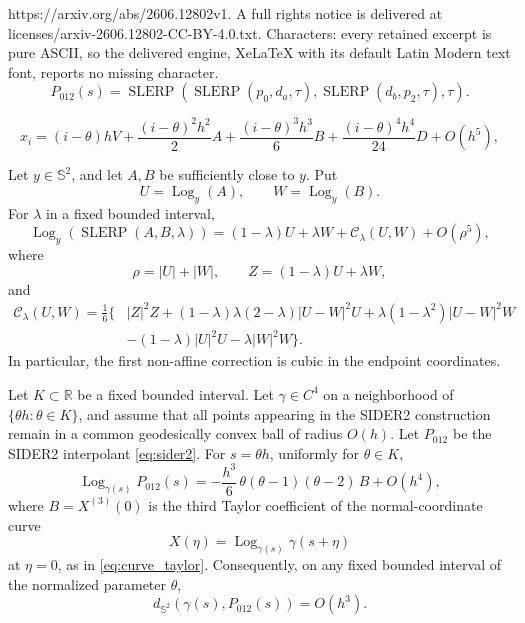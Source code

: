 \documentclass[10pt,a4paper]{amsart}
\newcommand{\Log}{\operatorname{Log}}
\newcommand{\SLERP}{\operatorname{SLERP}}
\newcommand{\bR}{\mathbb{R}}
\newcommand{\bS}{\mathbb{S}}
\begin{document}
https://arxiv.org/abs/2606.12802v1. A full rights notice is delivered at licenses/arxiv-2606.12802-CC-BY-4.0.txt. Characters: every retained excerpt is pure ASCII, so the delivered engine, XeLaTeX with its default Latin Modern text font, reports no missing character.
\begin{equation}
\label{eq:sider2}
P_{012}(s)
=
\SLERP\left(
        \SLERP(p_0,d_a,\tau),
        \SLERP(d_b,p_2,\tau),
        \tau
       \right).
\end{equation}

\begin{equation}
\label{eq:curve_taylor}
x_i
=
(i-\theta)h V
+\frac{(i-\theta)^2h^2}{2}A
+\frac{(i-\theta)^3h^3}{6}B
+\frac{(i-\theta)^4h^4}{24}D
+O(h^5),
\end{equation}

\begin{lemma}
\label{lem:cubic_slerp}
Let \(y\in\bS^2\), and let \(A,B\) be sufficiently close to \(y\).  Put
\[
        U=\Log_y(A),\qquad W=\Log_y(B).
\]
For \(\lambda\) in a fixed bounded interval,
\begin{equation}
\label{eq:cubic_slerp}
\Log_y\!\left(\SLERP(A,B,\lambda)\right)
=
(1-\lambda)U+\lambda W+\mathcal C_\lambda(U,W)+O(\rho^5),
\end{equation}
where
\[
        \rho=|U|+|W|,
        \qquad
        Z=(1-\lambda)U+\lambda W,
\]
and
\begin{align}
\label{eq:cubic_term}
\mathcal C_\lambda(U,W)
= \frac{1}{6}\Big\{&
|Z|^2Z
+(1-\lambda)\lambda(2-\lambda)|U-W|^2U
+\lambda(1-\lambda^2)|U-W|^2W     \nonumber\\
&-(1-\lambda)|U|^2U
-\lambda |W|^2W
\Big\}.
\end{align}
In particular, the first non-affine correction is cubic in the endpoint
coordinates.
\end{lemma}

\begin{prop}
\label{prop:sider2_refined}
Let \(K\subset\bR\) be a fixed bounded interval.  Let \(\gamma\in C^4\) on a
neighborhood of \(\{\theta h:\theta\in K\}\), and assume that all points
appearing in the SIDER2 construction remain in a common geodesically convex
ball of radius \(O(h)\).  Let \(P_{012}\) be the SIDER2 interpolant
\eqref{eq:sider2}.  For \(s=\theta h\), uniformly for \(\theta\in K\),
\begin{equation}
\label{eq:sider2_refined}
\Log_{\gamma(s)} P_{012}(s)
=
-\frac{h^3}{6}\,
\theta(\theta-1)(\theta-2)\, B
+O(h^4),
\end{equation}
where \(B=X^{(3)}(0)\) is the third Taylor coefficient of the normal-coordinate
curve
\[
        X(\eta)=\Log_{\gamma(s)}\gamma(s+\eta)
\]
at \(\eta=0\), as in \eqref{eq:curve_taylor}.  Consequently, on any fixed
bounded interval of the normalized parameter \(\theta\),
\[
        d_{\bS^2}\!\left(\gamma(s),P_{012}(s)\right)=O(h^3).
\]
\end{prop}
\end{document}
